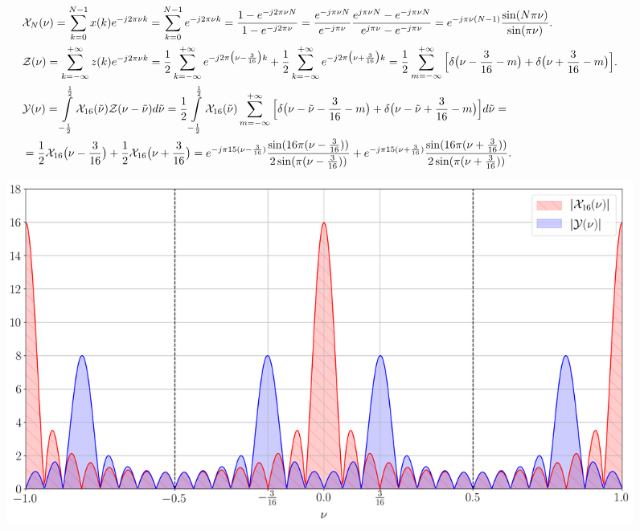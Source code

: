 \begin{align*}
	&\mathcal{X}_{N}(\nu) = \sum \limits_{k = 0}^{N-1} x(k)e^{-j2\pi \nu k} = \sum \limits_{k = 0}^{N-1} e^{-j2\pi \nu k} = 
	\dfrac{1 - e^{-j 2 \pi \nu N}}{1 - e^{-j 2 \pi \nu}} = \dfrac{e^{-j \pi \nu N}}{e^{-j \pi \nu}} 
	\dfrac{e^{j \pi \nu N} - e^{-j \pi \nu N}}{e^{j \pi \nu} - e^{-j \pi \nu}} = e^{-j \pi \nu (N-1)}\dfrac{\sin(N \pi \nu)}{\sin(\pi \nu)}.\\
	&\mathcal{Z}(\nu) = \sum \limits_{k = -\infty}^{+\infty} z(k)e^{-j2\pi \nu k} = \dfrac{1}{2}\sum \limits_{k=-\infty}^{+\infty} e^{-j2\pi \big(\nu - \frac{3}{16}\big) k} + \dfrac{1}{2}\sum \limits_{k =-\infty}^{+\infty} e^{-j2\pi \big(\nu + \frac{3}{16}\big) k} = \dfrac{1}{2}\sum \limits_{m = -\infty}^{+\infty}\Big[\delta\big(\nu - \frac{3}{16}-m\big) + \delta\big(\nu + \frac{3}{16}-m\big)\Big].\\
	&\mathcal{Y}(\nu) = \int \limits_{-\frac{1}{2}}^{\frac{1}{2}}\mathcal{X}_{16}(\tilde{\nu})\mathcal{Z}(\nu - \tilde{\nu})d\tilde{\nu} = \dfrac{1}{2}\int \limits_{-\frac{1}{2}}^{\frac{1}{2}}\mathcal{X}_{16}(\tilde{\nu})\sum \limits_{m = -\infty}^{+\infty}\Big[\delta\big(\nu - \tilde{\nu} - \frac{3}{16}-m\big) + \delta\big(\nu - \tilde{\nu} + \frac{3}{16}-m\big)\Big]d \tilde{\nu} =\\
	&=\dfrac{1}{2}\mathcal{X}_{16} \big(\nu - \frac{3}{16}\big) + \dfrac{1}{2}\mathcal{X}_{16} \big(\nu + \frac{3}{16}\big) = e^{-j \pi 15(\nu - \frac{3}{16})}\dfrac{\sin(16 \pi (\nu - \frac{3}{16}))}{2\sin(\pi (\nu - \frac{3}{16}))} + 
	e^{-j \pi 15(\nu + \frac{3}{16})}\dfrac{\sin(16 \pi (\nu + \frac{3}{16}))}{2\sin(\pi (\nu + \frac{3}{16}))}.
\end{align*}


\begin{figure}[!h]
	\centering
	\includegraphics[width=1.0\columnwidth]{pics/fall/2/2-3.png}
	\label{fig:2-3}
\end{figure}



